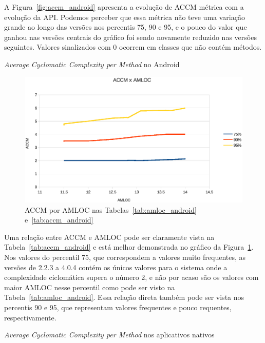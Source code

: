 A Figura~\ref{fig:accm_android} apresenta a evolução de ACCM métrica com a evolução da API. Podemos perceber que essa métrica não teve uma variação grande ao longo das versões nos percentis 75, 90 e 95, e o pouco do valor que ganhou nas versões centrais do gráfico foi sendo novamente reduzido nas versões seguintes. Valores sinalizados com 0 ocorrem em classes que não contém métodos.

\begin{table}[!htb]
\centering
{}

\caption{\textit{Average Cyclomatic Complexity per Method} no Android}
\label{tab:accm_android}
\end{table}

\begin{figure}[!htb]
\centering
\includegraphics [keepaspectratio=true,scale=0.85]{figuras/ACCMxAMLOC.eps}
\caption{ACCM por AMLOC nas Tabelas~\ref{tab:amloc_android} e~\ref{tab:accm_android}}
\label{fig:accmxamloc}
\end{figure}

Uma relação entre ACCM e AMLOC pode ser claramente vista na Tabela~\ref{tab:accm_android} e está melhor demonstrada no gráfico da Figura~\ref{fig:accmxamloc}. Nos valores do percentil 75, que correspondem a valores muito frequentes, as versões de 2.2.3 a 4.0.4 contém os únicos valores para o sistema onde a complexidade ciclomática supera o número 2, e não por acaso são os valores com maior AMLOC nesse percentil como pode ser visto na Tabela~\ref{tab:amloc_android}. Essa relação direta também pode ser vista nos percentis 90 e 95, que representam valores frequentes e pouco requentes, respectivamente.

\begin{table}[!htb]
\centering
{}

\caption{\textit{Average Cyclomatic Complexity per Method} nos aplicativos nativos}
\label{tab:accm_apps}
\end{table}

